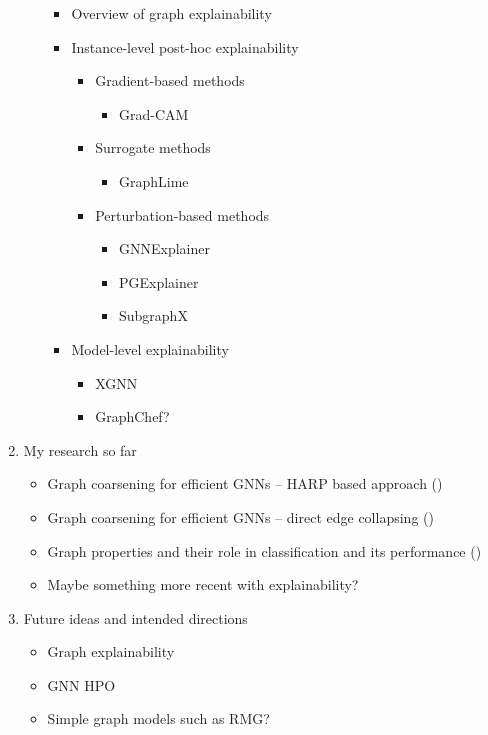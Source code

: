 \documentclass{ctuthesis}
\begin{document}
\begin{enumerate}
\begin{itemize}
				\begin{itemize}
					\item Overview of graph explainability
					\item Instance-level post-hoc explainability
						\begin{itemize}
							\item Gradient-based methods
								\begin{itemize}
									\item Grad-CAM
								\end{itemize}
							\item Surrogate methods
								\begin{itemize}
									\item GraphLime
								\end{itemize}
							\item Perturbation-based methods
								\begin{itemize}
									\item GNNExplainer
									\item PGExplainer
									\item SubgraphX
								\end{itemize}
						\end{itemize}
					\item Model-level explainability
						\begin{itemize}
							\item XGNN
							\item GraphChef?
						\end{itemize}
				\end{itemize}
		\end{itemize}
	\item My research so far
		\begin{itemize}
			\item Graph coarsening for efficient GNNs -- HARP based approach (\cite{dedic_balancing_2023, dedic_balancing_2024})
			\item Graph coarsening for efficient GNNs -- direct edge collapsing (\cite{prochazka_scalable_2022})
			\item Graph properties and their role in classification and its performance (\cite{prochazka_which_2023})
			\item Maybe something more recent with explainability?
		\end{itemize}
	\item Future ideas and intended directions
		\begin{itemize}
			\item Graph explainability
			\item GNN HPO
			\item Simple graph models such as RMG?
		\end{itemize}
\end{enumerate}

\printbibliography
\end{document}
